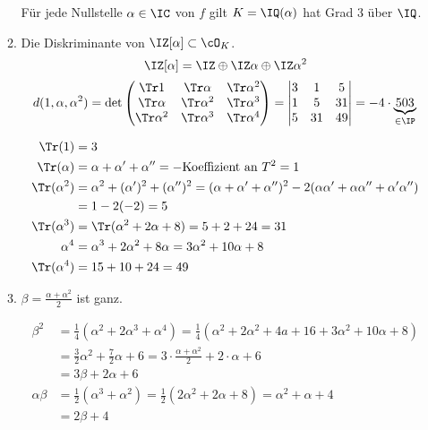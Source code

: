 \begin{Beispiel}
\begin{enumerate}
\begin{enumerate}
 Für jede Nullstelle $\alpha\in\IC$ von $f$ gilt $K=\IQ(\alpha)$ hat Grad $3$ über $\IQ$.
 \item Die Diskriminante von $\IZ[\alpha]\subset \cO_K$.
 \[ \IZ[\alpha] = \IZ \oplus \IZ \alpha \oplus \IZ \alpha^2\]
 \[ d(1,\alpha,\alpha^2)=\det\begin{pmatrix}
                              \Tr 1 & \Tr \alpha & \Tr \alpha^2\\
                              \Tr \alpha & \Tr \alpha^2 & \Tr \alpha^3\\
                              \Tr \alpha^2 & \Tr \alpha^3 & \Tr \alpha^4
                             \end{pmatrix}
                             =\begin{vmatrix}
                               3 & 1 & 5\\
                               1 & 5 & 31\\
                               5 & 31 & 49
                              \end{vmatrix}=-4\cdot \underbrace{503}_{\in\IP}\]

\begin{align*}
 \Tr(1)&=3\\
 \Tr(\alpha)&=\alpha+\alpha'+\alpha''=-\text{Koeffizient an }T^2=1 \\
 \Tr(\alpha^2)&=\alpha^2 + (\alpha')^2+(\alpha'')^2=(\alpha+\alpha'+\alpha'')^2-2(\alpha\alpha'+\alpha\alpha''+\alpha'\alpha'')\\
 &=1-2(-2)=5\\
 \Tr(\alpha^3)&=\Tr(\alpha^2+2\alpha+8)=5+2+24=31\\
 \alpha^4&=\alpha^3+2\alpha^2+8\alpha=3\alpha^2+10\alpha+8\\
 \Tr(\alpha^4)&= 15+10+24=49
\end{align*}

\item $\beta=\frac{\alpha+\alpha^2}{2}$ ist ganz.

\begin{align*}
\beta^2&=\frac{1}{4} (\alpha^2+2\alpha^3+\alpha^4)= \frac{1}{4}(\alpha^2+2\alpha^2+4a+16+3\alpha^2+10\alpha+8)\\
&= \frac{3}{2}\alpha^2+\frac{7}{2}\alpha+6 = 3\cdot \frac{\alpha+\alpha^2}{2}+2\cdot \alpha + 6\\
&= 3\beta + 2\alpha+6\\
 \alpha\beta &= \frac{1}{2}(\alpha^3+\alpha^2)=\frac{1}{2} (2\alpha^2+ 2\alpha + 8)=\alpha^2+\alpha+4\\
 &=2\beta+4
\end{align*}


\end{enumerate}
\end{enumerate}
\end{Beispiel}
